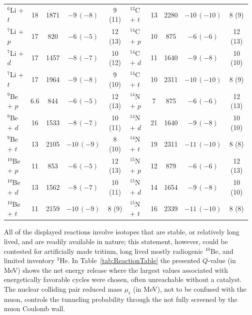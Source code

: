 \documentclass[particles,article,accept,pdftex,moreauthors]{Definitions/mdpi}
\begin{document}
\begin{table}[ht]
\begin{tabular*}{\linewidth}{@{\extracolsep{\fill}}lcccc|lcccc@{}}
${}^{6}$Li + $t$ & 18 & 1871 & $-9\,(-8)$ & 9 (11) & ${}^{13}$C + $t$ & 13 & 2280 & $-10\,(-10)$ & 8 (9) \\
${}^{7}$Li + $p$ & 17 & 820 & $-6\,(-5)$ & 12 (13) & ${}^{14}$C + $p$ & 10 & 875 & $-6\,(-6)$ & 12 (13) \\
${}^{7}$Li + $d$ & 17 & 1457 & $-8\,(-7)$ & 10 (12) & ${}^{14}$C + $d$ & 11 & 1640 & $-9\,(-8)$ & 10 (10) \\
${}^{7}$Li + $t$ & 17 & 1964 & $-9\,(-8)$ & 9 (10) & ${}^{14}$C + $t$ & 10 & 2311 & $-10\,(-10)$ & 8 (9) \\
${}^{9}$Be + $p$ & 6.6 & 844 & $-6\,(-5)$ & 12 (13) & ${}^{14}$N + $p$ & 7 & 875 & $-6\,(-6)$ & 12 (13) \\
${}^{9}$Be + $d$ & 16 & 1533 & $-8\,(-7)$ & 10 (11) & ${}^{14}$N + $d$ & 21 & 1640 & $-9\,(-8)$ & 10 (10) \\
${}^{9}$Be + $t$ & 13 & 2105 & $-10\,(-9)$ & 8 (10) & ${}^{14}$N + $t$ & 19 & 2311 & $-11\,(-10)$ & 8 (8) \\
${}^{10}$Be + $p$ & 11 & 853 & $-6\,(-5)$ & 12 (13) & ${}^{15}$N + $p$ & 12 & 879 & $-6\,(-6)$ & 12 (13) \\
${}^{10}$Be + $d$ & 13 & 1562 & $-8\,(-7)$ & 10 (11) & ${}^{15}$N + $d$ & 14 & 1654 & $-9\,(-8)$ & 10 (10) \\
${}^{10}$Be + $t$ & 11 & 2159 & $-10\,(-9)$ & 8 (9) & ${}^{15}$N + $t$ & 16 & 2339 & $-11\,(-10)$ & 8 (8) \\
\bottomrule
\end{tabular*}
\end{table}

All of the displayed reactions involve isotopes that are stable, or relatively long lived, and are readily available in nature; this statement, however, could be contested for artificially made tritium, long lived mostly radiogenic ${}^{10}\mathrm{Be}$, and limited inventory ${}^3\mathrm{He}$. In Table~\ref{tab:ReactionTable} the presented $Q$-value (in MeV) shows the net energy release where the largest values associated with energetically favorable cycles were chosen, often unreachable without a catalyst. The nuclear colliding pair reduced mass $\mu_\mathrm{r}$ (in MeV), not to be confused with the muon, controls the tunneling probability through the not fully screened by the muon Coulomb wall.
\end{document}
